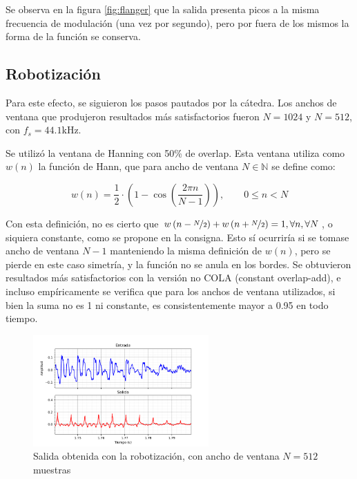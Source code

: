 \documentclass[assd_tp2_main.tex]{subfiles}
\begin{document}
Se observa en la figura \ref{fig:flanger} que la salida presenta picos a la misma frecuencia de modulaci\'on (una vez por segundo), pero por fuera de los mismos la forma de la funci\'on se conserva.


\subsection{Robotizaci\'on}

Para este efecto, se siguieron los pasos pautados por la c\'atedra. Los anchos de ventana que produjeron resultados m\'as satisfactorios fueron $N=1024$ y $N=512$, con $f_s = 44.1$kHz.

Se utiliz\'o la ventana de Hanning con 50\% de overlap. Esta ventana utiliza como $w(n)$ la funci\'on de Hann, que para ancho de ventana $N\in \mathbb{N}$ se define como:

\begin{equation}
	w(n) = \frac{1}{2} \cdot 
	\left( 1 - \cos{ \left( \frac{2\pi n}{N-1} \right) } \right),
	\qquad 0 \leq n < N
\end{equation}

Con esta definici\'on, no es cierto que $w\left(n-\nicefrac{N}{2}\right) + w\left(n+\nicefrac{N}{2}\right) = 1, \forall n, \forall N$, o siquiera constante, como se propone en la consigna. Esto s\'i ocurrir\'ia si se tomase ancho de ventana $N-1$ manteniendo la misma definici\'on de $w(n)$, pero se pierde en este caso simetr\'ia, y la funci\'on no se anula en los bordes. Se obtuvieron resultados m\'as satisfactorios con la versi\'on no COLA (constant overlap-add), e incluso emp\'iricamente se verifica que para los anchos de ventana utilizados, si bien la suma no es 1 ni constante, es consistentemente mayor a 0.95 en todo tiempo.

\begin{figure}[ht]	
	\centering
	\includegraphics[width=0.6\textwidth]
	{graficos/EJ8/rochi/robotizacion_512.png}
	\caption{Salida obtenida con la robotizaci\'on, con ancho de ventana $N=512$ muestras}
	\label{fig:robot512}
\end{figure}
\end{document}
